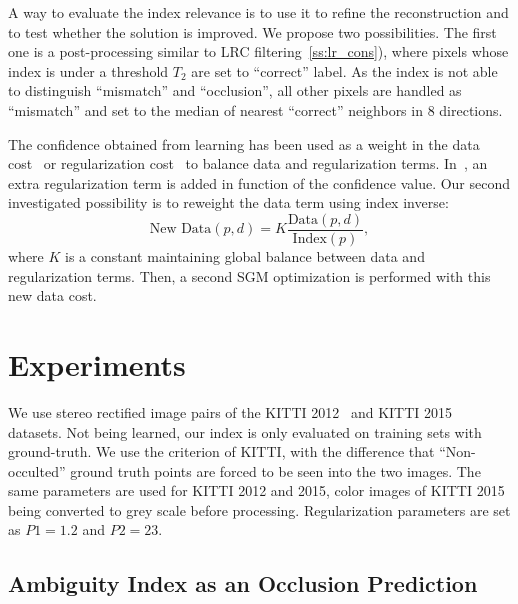 \documentclass{article}
\begin{document}
A way to evaluate the index relevance is to use it to refine the reconstruction and to test whether the solution is improved. We propose two possibilities. The first one is a post-processing similar to LRC filtering~\ref{ss:lr_cons}), where pixels whose index is under a threshold $T_2$ are set to ``correct'' label. As the index is not able to distinguish ``mismatch'' and ``occlusion'', all other pixels are handled as ``mismatch'' and set to the median of nearest ``correct'' neighbors in 8 directions.

The confidence obtained from learning has been used as a weight in the data cost~\cite{park15} or regularization cost~\cite{spyropoulos14} to balance data and regularization terms. In~\cite{seki16}, an extra regularization term is added in function of the confidence value. Our second investigated possibility is to reweight the data term using index inverse:
\begin{equation}
\text{New Data}(p,d) = K\frac{\text{Data}(p,d)}{\text{Index}(p)},
\end{equation}
where $K$ is a constant maintaining global balance between data and regularization terms. Then, a second SGM optimization is performed with this new data cost.

\section{Experiments}
\label{sec:experimentation}

We use stereo rectified image pairs of the KITTI 2012~\cite{geiger13} and KITTI 2015~\cite{menze15} datasets. Not being learned, our index is only evaluated on training sets with ground-truth. We use the criterion of KITTI, with the difference that ``Non-occulted'' ground truth points are forced to be seen into the two images. The same parameters are used for KITTI 2012 and 2015, color images of KITTI 2015 being converted to grey scale before processing. Regularization parameters are set as $P1=1.2$ and $P2=23$.

\subsection{Ambiguity Index as an Occlusion Prediction}
\end{document}
